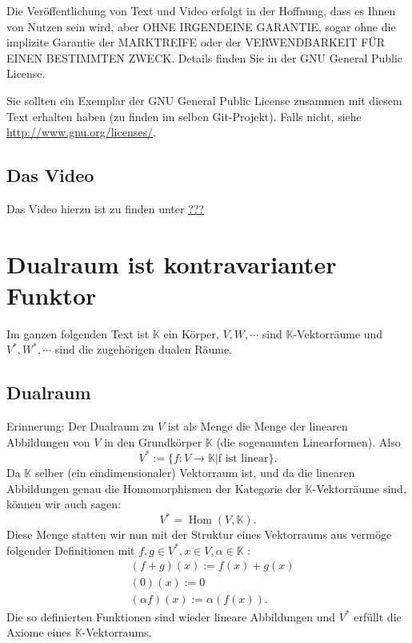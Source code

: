 \documentclass[a4paper]{amsart}
\theoremstyle{definition}
\DeclareMathOperator{\Hom}{Hom}
\newcommand{\K}{\ensuremath{\mathbb{ K }}}
\begin{document}
Die Veröffentlichung von Text und Video erfolgt in der Hoffnung, dass es Ihnen von Nutzen sein wird, 
aber OHNE IRGENDEINE GARANTIE, sogar ohne die implizite Garantie der MARKTREIFE oder der 
VERWENDBARKEIT FÜR EINEN BESTIMMTEN ZWECK. Details finden Sie in der GNU General Public License.

Sie sollten ein Exemplar der GNU General Public License zusammen mit diesem Text erhalten haben 
(zu finden im selben Git-Projekt). 
Falls nicht, siehe \url{http://www.gnu.org/licenses/}.

\subsection*{Das Video}
Das Video hierzu ist zu finden unter \url{???}

\section{Dualraum ist kontravarianter Funktor}
Im ganzen folgenden Text ist $\K$ ein Körper, $V,W, \cdots$ sind $\K$-Vektorräume und $V^*,W^*, \cdots$ sind die zugehörigen dualen Räume.

\subsection{Dualraum}
Erinnerung: Der Dualraum zu $V$ ist als Menge die Menge der linearen Abbildungen von $V$ in den Grundkörper $\K$ (die sogenannten Linearformen).  Also
\begin{equation}
   V^* := \{ f \colon V \to \K | \text{f ist linear} \}.
\end{equation}
Da $\K$ selber (ein eindimensionaler) Vektorraum ist, und da die linearen Abbildungen genau die Homomorphismen der Kategorie der $\K$-Vektorräume sind, können wir auch sagen:
\begin{equation}
   V^* = \Hom( V, \K ).
\end{equation}
Diese Menge statten wir nun mit der Struktur eines Vektorraums aus vermöge folgender Definitionen mit 
$f,g \in V^*, x \in V, \alpha \in \K$ :
\begin{align}
   &(f+g)(x) := f(x) + g(x)\\
   &(0)(x) := 0\\
   &(\alpha f)(x) := \alpha ( f(x) ).
\end{align}
Die so definierten Funktionen sind wieder lineare Abbildungen und $V^*$ erfüllt die Axiome eines 
$\K$-Vektorraums.
\end{document}
